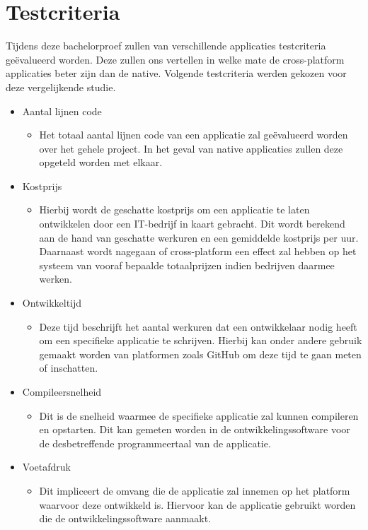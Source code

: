 \section{Testcriteria}
\label{sec:SVZtestcriteria}
Tijdens deze bachelorproef zullen van verschillende applicaties testcriteria geëvalueerd worden. Deze zullen ons vertellen in welke mate de cross-platform applicaties beter zijn dan de native. Volgende testcriteria werden gekozen voor deze vergelijkende studie.
\begin{itemize}
    \item Aantal lijnen code
    \begin{itemize}
        \item Het totaal aantal lijnen code van een applicatie zal geëvalueerd worden over het gehele project. In het geval van native applicaties zullen deze opgeteld worden met elkaar.
    \end{itemize}
    \item Kostprijs
    \begin{itemize}
        \item Hierbij wordt de geschatte kostprijs om een applicatie te laten ontwikkelen door een IT-bedrijf in kaart gebracht. Dit wordt berekend aan de hand van geschatte werkuren en een gemiddelde kostprijs per uur. Daarnaast wordt nagegaan of cross-platform een effect zal hebben op het systeem van vooraf bepaalde totaalprijzen indien bedrijven daarmee werken.
    \end{itemize}
    \item Ontwikkeltijd
    \begin{itemize}
        \item Deze tijd beschrijft het aantal werkuren dat een ontwikkelaar nodig heeft om een specifieke applicatie te schrijven. Hierbij kan onder andere gebruik gemaakt worden van platformen zoals GitHub om deze tijd te gaan meten of inschatten.
    \end{itemize}
    \item Compileersnelheid
    \begin{itemize}
        \item Dit is de snelheid waarmee de specifieke applicatie zal kunnen compileren en opstarten. Dit kan gemeten worden in de ontwikkelingssoftware voor de desbetreffende programmeertaal van de applicatie.
    \end{itemize}
    \item Voetafdruk
    \begin{itemize}
        \item Dit impliceert de omvang die de applicatie zal innemen op het platform waarvoor deze ontwikkeld is. Hiervoor kan de applicatie gebruikt worden die de ontwikkelingssoftware aanmaakt.

\end{itemize}
\end{itemize}
